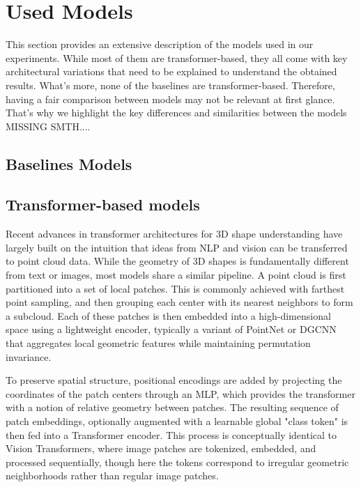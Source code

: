 \section{Used Models}


This section provides an extensive description of the models used in our experiments. While most of them are transformer-based, they all come with key architectural variations that need to be explained to understand the obtained results. What's more, none of the baselines are transformer-based. Therefore, having a fair comparison between models may not be relevant at first glance. That's why we highlight the key differences and similarities between the models MISSING SMTH....

\subsection{Baselines Models}
\label{ssec:baselines_models}

\subsection{Transformer-based models}
\label{ssec:transformer_based_models}

Recent advances in transformer architectures for 3D shape understanding have largely built on the intuition that ideas from NLP and vision can be transferred to point cloud data. While the geometry of 3D shapes is fundamentally different from text or images, most models share a similar pipeline. A point cloud is first partitioned into a set of local patches. This is commonly achieved with farthest point sampling, and then grouping each center with its nearest neighbors to form a subcloud. Each of these patches is then embedded into a high-dimensional space using a lightweight encoder, typically a variant of PointNet or DGCNN that aggregates local geometric features while maintaining permutation invariance.

To preserve spatial structure, positional encodings are added by projecting the coordinates of the patch centers through an MLP, which provides the transformer with a notion of relative geometry between patches. The resulting sequence of patch embeddings, optionally augmented with a learnable global "class token" is then fed into a Transformer encoder. This process is conceptually identical to Vision Transformers, where image patches are tokenized, embedded, and processed sequentially, though here the tokens correspond to irregular geometric neighborhoods rather than regular image patches.

